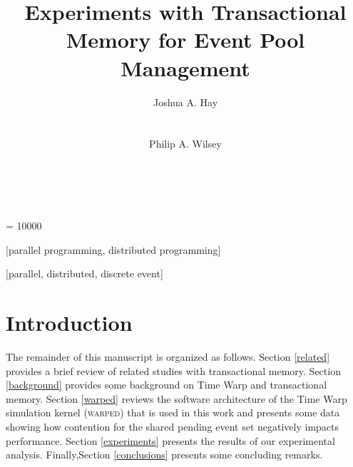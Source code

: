 \documentclass{sig-alternate}
\begin{document}
\widowpenalty = 10000

\title{Experiments with Transactional Memory for Event Pool Management}


\author{
\alignauthor
Joshua A. Hay \\
       \\
       \\
\alignauthor
Philip A. Wilsey \\
       \\
       \\
}

\maketitle

\begin{abstract}



\end{abstract}

[parallel
  programming, distributed programming]

[parallel,
  distributed, discrete event]



\section{Introduction}\label{introduction}



The remainder of this manuscript is organized as follows.  
Section \ref{related} provides a brief review of related studies with
transactional memory.  
Section \ref{background}
provides some background on Time Warp and transactional memory.
Section \ref{warped} reviews the software
architecture of the Time Warp simulation kernel (\textsc{warped}) that is used
in this work and presents some data showing how contention for the shared
pending event set negatively impacts performance.  
Section \ref{experiments} presents the results of our
experimental analysis.  
Finally,Section \ref{conclusions} presents some concluding remarks.
\end{document}

